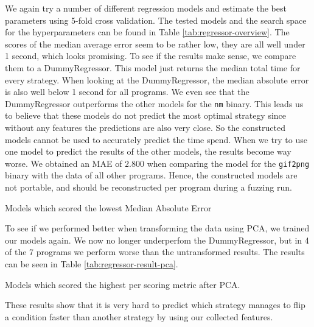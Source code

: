We again try a number of different regression models and estimate the best parameters using 5-fold cross validation. The tested models and the search space for the hyperparameters can be found in Table \ref{tab:regressor-overview}. The scores of the median average error seem to be rather low, they are all well under 1 second, which looks promising.
To see if the results make sense, we compare them to a DummyRegressor. This model just returns the median total time for every strategy.
When looking at the DummyRegressor, the median absolute error is also well below 1 second for all programs. We even see that the DummyRegressor outperforms the other models for the \texttt{nm} binary. This leads us to believe that these models do not predict the most optimal strategy since without any features the predictions are also very close. So the constructed models cannot be used to accurately predict the time spend.
When we try to use one model to predict the results of the other models, the results become way worse. We obtained an MAE of $2.800$ when comparing the model for the \texttt{gif2png} binary with the data of all other programs. Hence, the constructed models are not portable, and should be reconstructed per program during a fuzzing run.
\begin{table}[H]
\centering

\caption{Models which scored the lowest Median Absolute Error}\label{tab:regressor-result}
\end{table}

To see if we performed better when transforming the data using PCA, we trained our models again. We now no longer underperfom the DummyRegressor, but in 4 of the 7 programs we perform worse than the untransformed results. The results can be seen in Table \ref{tab:regressor-result-pca}. 
\begin{table}[H]
\centering

\caption{Models which scored the highest per scoring metric after PCA.}\label{tab:regressor-result-pca}
\end{table}
These results show that it is very hard to predict which strategy manages to flip a condition faster than another strategy by using our collected features.